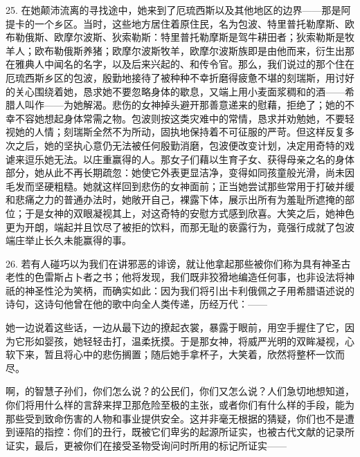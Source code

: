 25. 在她颠沛流离的寻找途中，她来到了厄琉西斯以及其他地区的边界——那是阿提卡的一个乡区。当时，这些地方居住着原住民，名为包波、特里普托勒摩斯、欧布勒俄斯、欧摩尔波斯、狄索勒斯：特里普托勒摩斯是驾牛耕田者；狄索勒斯是牧羊人；欧布勒俄斯养猪；欧摩尔波斯牧羊，欧摩尔波斯族即是由他而来，衍生出那在雅典人中闻名的名字，以及后来兴起的、和传令官。那么，我们说过的那个住在厄琉西斯乡区的包波，殷勤地接待了被种种不幸折磨得疲惫不堪的刻瑞斯，用讨好的关心围绕着她，恳求她不要忽略身体的歇息，又端上用小麦面浆稠和的酒——希腊人叫作——为她解渴。悲伤的女神掉头避开那善意递来的慰藉，拒绝了；她的不幸不容她想起身体常需之物。包波则按这类灾难中的常情，恳求并劝勉她，不要轻视她的人情；刻瑞斯全然不为所动，固执地保持着不可征服的严苛。但这样反复多次之后，她的坚执心意仍无法被任何殷勤消磨，包波便改变计划，决定用奇特的戏谑来逗乐她无法。以庄重赢得的人。那女子们藉以生育子女、获得母亲之名的身体部分，她从此不再长期疏忽：她使它外表更显洁净，变得如同孩童般光滑，尚未因毛发而坚硬粗糙。她就这样回到悲伤的女神面前；正当她尝试那些常用于打破并缓和悲痛之力的普通办法时，她敞开自己，裸露下体，展示出所有为羞耻所遮掩的部位；于是女神的双眼凝视其上，对这奇特的安慰方式感到欣喜。大笑之后，她神色更为开朗，端起并且饮尽了被拒的饮料，而那无耻的亵露行为，竟强行成就了包波端庄举止长久未能赢得的事。\par

26. 若有人碰巧以为我们在讲邪恶的诽谤，就让他拿起那些被你们称为具有神圣古老性的色雷斯占卜者之书；他将发现，我们既非狡猾地编造任何事，也非设法将神祇的神圣性沦为笑柄，而确实如此：因为我们将引出卡利俄佩之子用希腊语述说的诗句，这诗句他曾在他的歌中向全人类传递，历经万代：——\par

她一边说着这些话，一边从最下边的撩起衣裳，\newline{}暴露于眼前，\newline{}用空手握住了它，因为\newline{}它形如婴孩，她轻轻击打，温柔抚摸。\newline{}于是那女神，将威严光明的双眸凝视，\newline{}心软下来，暂且将心中的悲伤搁置；\newline{}随后她手拿杯子，大笑着，\newline{}欣然将整杯一饮而尽。\par

啊，的智慧子孙们，你们怎么说？的公民们，你们又怎么说？人们急切地想知道，你们将用什么样的言辞来捍卫那危险至极的主张，或者你们有什么样的手段，能为那些受到致命伤害的人物和事业提供安全。这并非毫无根据的猜疑，你们也不是遭到诬陷的指控：你们的丑行，既被它们卑劣的起源所证实，也被古代文献的记录所证实，最后，更被你们在接受圣物受询问时所用的标记所证实——\par

